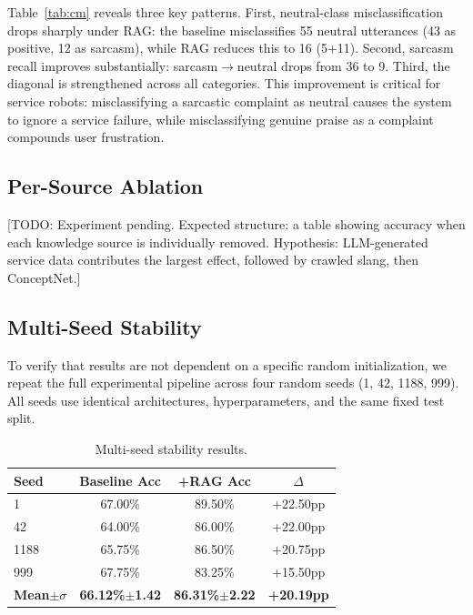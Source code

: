\documentclass[conference]{IEEEtran}
\begin{document}
Table~\ref{tab:cm} reveals three key patterns. First, neutral-class
misclassification drops sharply under RAG: the baseline misclassifies 55 neutral
utterances (43 as positive, 12 as sarcasm), while RAG reduces this to 16 (5+11).
Second, sarcasm recall improves substantially: sarcasm$\rightarrow$neutral drops
from 36 to 9. Third, the diagonal is strengthened across all categories.
This improvement is critical for service robots: misclassifying a sarcastic
complaint as neutral causes the system to ignore a service failure, while
misclassifying genuine praise as a complaint compounds user frustration.

\subsection{Per-Source Ablation}

[TODO: Experiment pending. Expected structure: a table showing accuracy when
each knowledge source is individually removed. Hypothesis: LLM-generated service
data contributes the largest effect, followed by crawled slang, then ConceptNet.]

\subsection{Multi-Seed Stability}

To verify that results are not dependent on a specific random initialization,
we repeat the full experimental pipeline across four random seeds
(1, 42, 1188, 999). All seeds use identical architectures, hyperparameters, and
the same fixed test split.

\begin{table}[H]
\centering
\caption{Multi-seed stability results.}
\label{tab:multiseed}
\begin{tabular}{lccc}
\toprule
\textbf{Seed} & \textbf{Baseline Acc} & \textbf{+RAG Acc} & $\Delta$ \\
\midrule
1    & 67.00\% & 89.50\% & +22.50pp \\
42   & 64.00\% & 86.00\% & +22.00pp \\
1188 & 65.75\% & 86.50\% & +20.75pp \\
999  & 67.75\% & 83.25\% & +15.50pp \\
\midrule
\textbf{Mean$\pm\sigma$} & \textbf{66.12\%$\pm$1.42} & \textbf{86.31\%$\pm$2.22} & \textbf{+20.19pp} \\
\bottomrule
\end{tabular}
\end{table}
\end{document}
